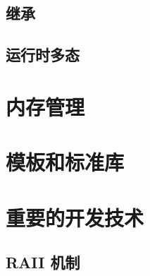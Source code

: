 \documentclass[hyperref,UTF8]{article}
\begin{document}
\subsection{继承}

\subsection{运行时多态}

\section{内存管理}

\section{模板和标准库}

\section{重要的开发技术}

\subsection{RAII 机制}
\end{document}

